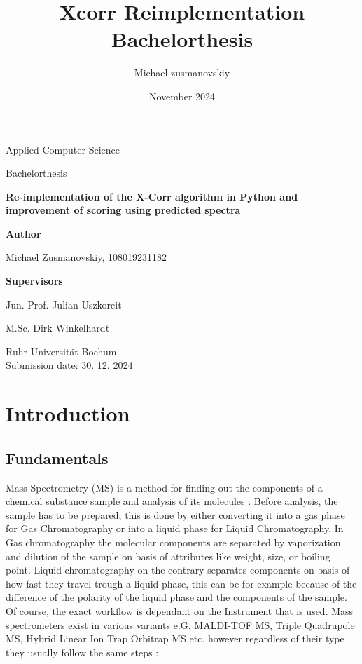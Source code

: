 \documentclass[12pt]{article}
\title{Xcorr Reimplementation Bachelorthesis}
\author{Michael zusmanovskiy}
\date{November 2024}
\begin{document}
\begin{titlepage}
    \begin{center}
        \LARGE
        Applied Computer Science

        \vspace{1cm}
        
        \LARGE
        Bachelorthesis

        \vspace{1cm}
            
        \LARGE
        \textbf{Re-implementation of the X-Corr algorithm in Python and improvement of scoring using predicted spectra}
            
        \vspace{1cm}

        \LARGE
        \textbf{Author}
        
        Michael Zusmanovskiy, 108019231182
        
        \vspace{1cm}
        
        \LARGE
        \textbf{Supervisors}
        
        Jun.-Prof. Julian Uszkoreit
        
        M.Sc. Dirk Winkelhardt
            
        \vfill
            
        \Large
        Ruhr-Universität Bochum\\
        
        Submission date: 30. 12. 2024
            
    \end{center}
\end{titlepage}


\section{Introduction}
\subsection{Fundamentals}
Mass Spectrometry (MS) is a method for finding out the components of a chemical substance sample and analysis of its molecules \cite{mass-specrometer}. Before analysis, the sample has to be prepared, this is done by either converting it into a gas phase for Gas Chromatography or into a liquid phase for Liquid Chromatography. In Gas chromatography the molecular components are separated by vaporization and dilution of the sample on basis of attributes like weight, size, or boiling point. Liquid chromatography on the contrary separates components on basis of how fast they travel trough a liquid phase, this can be for example because of the difference of the polarity of the liquid phase and the components of the sample. Of course, the exact workflow is dependant on the Instrument that is used. Mass spectrometers exist in various variants e.G. MALDI-TOF MS, Triple Quadrupole MS, Hybrid Linear Ion Trap Orbitrap MS etc.  \cite{mass-specrometer-types} however regardless of their type they usually follow the same steps \cite{mass-specrometer, what-is-mass-spectrometry}: 
\end{document}
